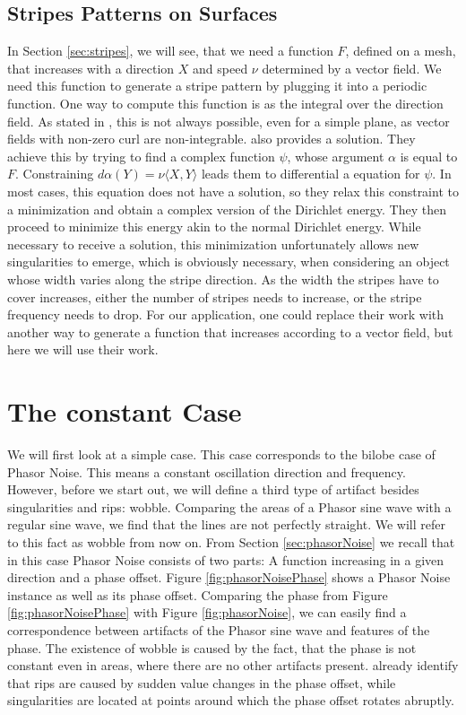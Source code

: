 \documentclass{utue} %
\begin{document}
\subsection{Stripes Patterns on Surfaces}
In Section \ref{sec:stripes}, we will see, that we need a function $F$, defined on a mesh, that increases with a direction $X$ and speed $\nu$ determined by a vector field. We need this function to generate a stripe pattern by plugging it into a periodic function. One way to compute this function is as the integral over the direction field. As stated in \cite{stripes}, this is not always possible, even for a simple plane, as vector fields with non-zero curl are non-integrable. \cite{stripes} also provides a solution. They achieve this by trying to find a complex function $\psi$, whose argument $\alpha$ is equal to $F$. Constraining $d\alpha(Y) = \nu\langle X,Y\rangle$ leads them to differential a equation for $\psi$. In most cases, this equation does not have a solution, so they relax this constraint to a minimization and obtain a complex version of the Dirichlet energy. They then proceed to minimize this energy akin to the normal Dirichlet energy. While necessary to receive a solution, this minimization unfortunately allows new singularities to emerge, which is obviously necessary, when considering an object whose width varies along the stripe direction. As the width the stripes have to cover increases, either the number of stripes needs to increase, or the stripe frequency needs to drop. For our application, one could replace their work with another way to generate a function that increases according to a vector field, but here we will use their work.

\section{The constant Case}
We will first look at a simple case. This case corresponds to the bilobe case of Phasor Noise. This means a constant oscillation direction and frequency. However, before we start out, we will define a third type of artifact besides singularities and rips: wobble. Comparing the areas of a Phasor sine wave with a regular sine wave, we find that the lines are not perfectly straight. We will refer to this fact as wobble from now on. From Section \ref{sec:phasorNoise} we recall that in this case Phasor Noise consists of two parts: A function increasing in a given direction and a phase offset. Figure \ref{fig:phasorNoisePhase} shows a Phasor Noise instance as well as its phase offset. Comparing the phase from Figure \ref{fig:phasorNoisePhase} with Figure \ref{fig:phasorNoise}, we can easily find a correspondence between artifacts of the Phasor sine wave and features of the phase. The existence of wobble is caused by the fact, that the phase is not constant even in areas, where there are no other artifacts present. \citeauthor{phasorNoise} already identify that rips are caused by sudden value changes in the phase offset, while singularities are located at points around which the phase offset rotates abruptly.\\
\end{document}
